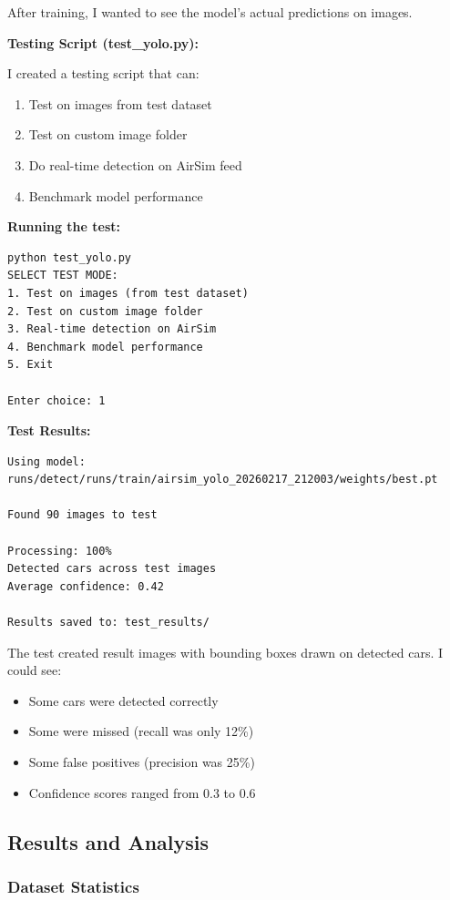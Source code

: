 After training, I wanted to see the model's actual predictions on images.

\textbf{Testing Script (test\_yolo.py):}

I created a testing script that can:
\begin{enumerate}
	\item Test on images from test dataset
	\item Test on custom image folder
	\item Do real-time detection on AirSim feed
	\item Benchmark model performance
\end{enumerate}

\textbf{Running the test:}
\begin{verbatim}
python test_yolo.py
SELECT TEST MODE:
1. Test on images (from test dataset)
2. Test on custom image folder
3. Real-time detection on AirSim
4. Benchmark model performance
5. Exit

Enter choice: 1
\end{verbatim}

\textbf{Test Results:}
\begin{verbatim}
Using model: runs/detect/runs/train/airsim_yolo_20260217_212003/weights/best.pt

Found 90 images to test

Processing: 100%
Detected cars across test images
Average confidence: 0.42

Results saved to: test_results/
\end{verbatim}

The test created result images with bounding boxes drawn on detected cars. I could see:
\begin{itemize}
	\item Some cars were detected correctly
	\item Some were missed (recall was only 12\%)
	\item Some false positives (precision was 25\%)
	\item Confidence scores ranged from 0.3 to 0.6
\end{itemize}

\subsection{Results and Analysis}

\subsubsection{Dataset Statistics}

